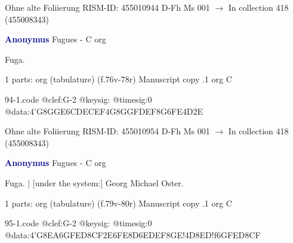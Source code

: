 \documentclass[twocolumn]{book}
\begin{document}
\newline Ohne alte Foliierung
\newline RISM-ID: 455010944
\newline D-Fh  Ms 001
\newline $\rightarrow$ In collection 418 (455008343)
      
\newline \par \vspace{7pt} \textcolor{darkblue}{\textbf{Anonymus  }}
\newline Fugues - C
\newline org
\newline \begin{itshape}[f.76v, at left:] Fuga.\end{itshape} 
\newline \textcolor{darkblue}{}  1 parts: org (tabulature)  (f.76v-78r)
\newline Manuscript copy
.1  org  C  
\begin{filecontents*}{94-1.code}
@clef:G-2
@keysig:
@timesig:0
@data:4'G{8GG}{E6CD}{ECEF}4G{8GG}{FDEF}{8G6FE}4D2E
\end{filecontents*}
\newline
%

\newline Ohne alte Foliierung
\newline RISM-ID: 455010954
\newline D-Fh  Ms 001
\newline $\rightarrow$ In collection 418 (455008343)
      
\newline \par \vspace{7pt} \textcolor{darkblue}{\textbf{Anonymus  }}
\newline Fugues - C
\newline org
\newline \begin{itshape}[f.79v, at left:] Fuga. | [under the system:] Georg Michael Oster.\end{itshape} 
\newline \textcolor{darkblue}{}  1 parts: org (tabulature)  (f.79v-80r)
\newline Manuscript copy
.1  org  C  
\begin{filecontents*}{95-1.code}
@clef:G-2
@keysig:
@timesig:0
@data:4'G{8EA}{6GFED}{8CF}2E{6FE8D}{6EDEF}{8GE}!4D{8ED}!f{6GFED}{8CF}
\end{filecontents*}
\newline
%
\end{document}
